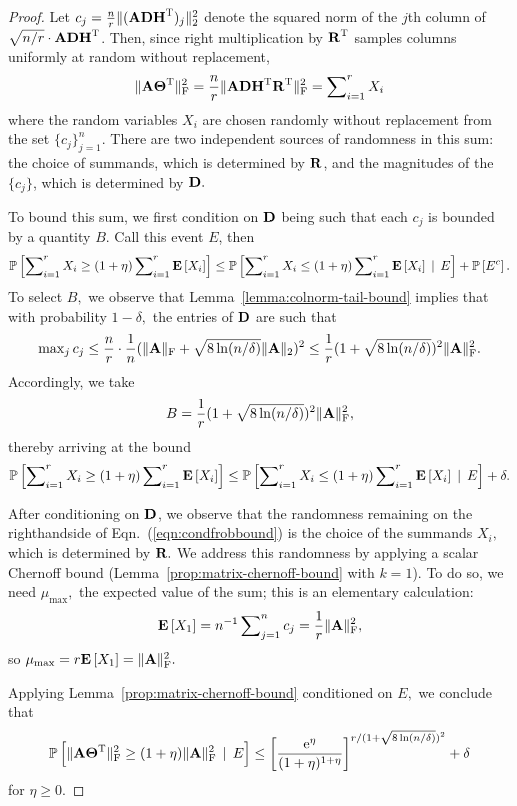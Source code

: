 \begin{proof}
Let $c_j = {n\over r} \mbox{}\|({\bm{\mathrm{A}}} {\bm{\mathrm{D}}} {\bm{\mathrm{H}}}^{\textsc{T}})_j\|_2^2$ denote the squared norm of the $j$th column of $\sqrt{n/r} \cdot {\ensuremath{\bm{\mathrm{A}}}} {\ensuremath{\bm{\mathrm{D}}}} {\ensuremath{\bm{\mathrm{H}}}}^{\textsc{T}}$. Then, since right multiplication by ${\bm{\mathrm{R}}}^{\textsc{T}}$ samples columns uniformly at random without replacement,
%
\begin{equation}
\label{eqn:frobenius-norm-upperbound}
 \FNormS{\matA \matTh\transp} = \frac{n}{r} \FNormS{\matA \matD \matH\transp \matR\transp } = \sum\nolimits_{i=1}^r X_i
\end{equation}
%
where the random variables $X_i$ are chosen randomly without replacement from the set $\{c_j\}_{j=1}^n.$ There are two independent sources of randomness in this sum: the choice of summands, which is determined by ${\bm{\mathrm{R}}}$, and the magnitudes of the $\{c_j\}$, which is determined by ${\bm{\mathrm{D}}}.$

To bound this sum, we first condition on ${\bm{\mathrm{D}}}$ being such that each $c_j$ is bounded by a quantity $B.$ Call this event $E$, then
\[
\mbox{}{\mathbb{P}}\left[\sum\nolimits_{i=1}^r X_i \geq (1 + \eta) \sum\nolimits_{i=1}^r {{\mathbf E}\left[X_i\right]} \right] \leq \mbox{}{\mathbb{P}}\left[\sum\nolimits_{i=1}^r X_i \leq (1 + \eta) \sum\nolimits_{i=1}^r {{\mathbf E}\left[X_i\right]} \,\mid\, E\right] + \mbox{}{\mathbb{P}}\left[E^c\right].
\]
To select $B,$ we observe that Lemma~\ref{lemma:colnorm-tail-bound} implies that with probability $1 - \delta,$ the entries of ${\bm{\mathrm{D}}}$ are such that
\[
 \max\nolimits_j c_j \leq {n\over r} \cdot {1\over n} (\mbox{}\|{\bm{\mathrm{A}}}\|_\mathrm{F} + \sqrt{8 \ln(n/\delta)} \mbox{}\|{\bm{\mathrm{A}}}\|_2)^2 \leq  {1\over r} (1 + \sqrt{8 \ln(n/\delta)})^2 \mbox{}\|{\bm{\mathrm{A}}}\|_\mathrm{F}^2.
\]
Accordingly, we take
\[
 B = {1\over r}(1 + \sqrt{8 \ln(n/\delta)})^2 \mbox{}\|{\bm{\mathrm{A}}}\|_\mathrm{F}^2,
\]
thereby arriving at the bound
\begin{equation}
\label{eqn:condfrobbound}
\Probab{\sum\nolimits_{i=1}^r X_i \geq (1 + \eta) \sum\nolimits_{i=1}^r \E{X_i} } \leq \Probab{\sum\nolimits_{i=1}^r X_i \leq (1 + \eta) \sum\nolimits_{i=1}^r \E{X_i} \,\mid\, E} + \delta.
\end{equation}

After conditioning on ${\bm{\mathrm{D}}}$, we observe that the randomness remaining on the righthandside of Eqn.~(\ref{eqn:condfrobbound}) is the choice of the summands $X_i,$ which is determined by ${\bm{\mathrm{R}}}.$ We address this randomness by applying a scalar Chernoff bound (Lemma~\ref{prop:matrix-chernoff-bound} with $k=1$). To do so, we need $\mu_{\text{max}},$ the expected value of the sum; this is an elementary calculation:
\[
 {{\mathbf E}\left[X_1\right]} = n^{-1} \sum\nolimits_{j=1}^n c_j = {1\over r} \mbox{}\|{\bm{\mathrm{A}}}\|_\mathrm{F}^2,
\]
so $\mu_{\text{max}} = r {{\mathbf E}\left[X_1\right]} = \mbox{}\|{\bm{\mathrm{A}}}\|_\mathrm{F}^2.$

Applying Lemma~\ref{prop:matrix-chernoff-bound} conditioned on $E,$  we conclude that
\[
 \mbox{}{\mathbb{P}}\left[\mbox{}\|{\bm{\mathrm{A}}} {\bm{\mathrm{\Theta}}}^{\textsc{T}}\|_\mathrm{F}^2 \geq (1 + \eta) \mbox{}\|{\bm{\mathrm{A}}}\|_\mathrm{F}^2\,\mid\, E \right] \leq \left[ {{\mathrm e}^\eta\over (1+\eta)^{1+\eta}} \right]^{r/(1 + \sqrt{8 \ln(n/\delta)})^2} + \delta
\]
for $\eta \geq 0.$
\end{proof}

